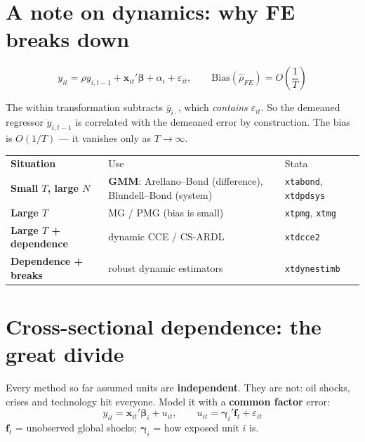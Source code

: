 \documentclass[11pt,a4paper]{article}
\newcommand{\cmd}[1]{\texttt{\textcolor{corange}{#1}}}
\newcommand{\bbeta}{\boldsymbol{\beta}}
\newcommand{\bgamma}{\boldsymbol{\gamma}}
\newcommand{\bx}{\mathbf{x}}
\newcommand{\bff}{\mathbf{f}}
\begin{document}
\section{A note on dynamics: why FE breaks down}

\begin{eqbox}
\[ y_{it}=\rho y_{i,t-1}+\bx_{it}'\bbeta+\alpha_i+\varepsilon_{it},
\qquad \mathrm{Bias}(\hat\rho_{FE})=O\!\left(\frac1T\right) \]
\end{eqbox}
\begin{idea}
The within transformation subtracts $\bar y_{i\cdot}$, which \emph{contains} $\varepsilon_{it}$.
So the demeaned regressor $\ddot y_{i,t-1}$ is correlated with the demeaned error by construction.
The bias is $O(1/T)$ --- it vanishes only as $T\to\infty$.
\end{idea}
\begin{center}
\begin{tabular}{@{}>{\bfseries}l p{9.4cm} l@{}}
\rowcolor{corange}\color{white}Situation & \color{white}Use & \color{white}Stata\\
Small $T$, large $N$ & \textbf{GMM}: Arellano--Bond (difference), Blundell--Bond (system) & \cmd{xtabond}, \cmd{xtdpdsys}\\
Large $T$ & MG / PMG (bias is small) & \cmd{xtpmg}, \cmd{xtmg}\\
Large $T$ + dependence & dynamic CCE / CS-ARDL & \cmd{xtdcce2}\\
Dependence + \textbf{breaks} & robust dynamic estimators & \cmd{xtdynestimb}\\
\end{tabular}
\end{center}

\section{Cross-sectional dependence: the great divide}

\begin{idea}
Every method so far assumed units are \textbf{independent}. They are not: oil shocks, crises and
technology hit everyone. Model it with a \textbf{common factor} error:
\[ y_{it}=\bx_{it}'\bbeta_i+u_{it},\qquad u_{it}=\bgamma_i'\bff_t+\varepsilon_{it} \]
$\bff_t$ = unobserved global shocks; $\bgamma_i$ = how exposed unit $i$ is.
\end{idea}
\end{document}
